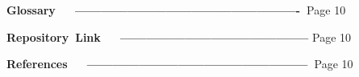\documentclass[12pt]{article}
\begin{document}
\vspace{\baselineskip}
\textbf{ Glossary\  \ \ ----------------------------------------------------\   }Page 10\par


\vspace{\baselineskip}
\textbf{ Repository\ Link\ \ \ --------------------------------------------   }Page 10\par


\vspace{\baselineskip}
\textbf{ References\ \ \ ---------------------------------------------------\   }Page 10\par


\vspace{\baselineskip}

\vspace{\baselineskip}

\vspace{\baselineskip}
 \par


\vspace{\baselineskip}
\setlength{\parskip}{8.04pt}

\vspace{\baselineskip}

\vspace{\baselineskip}

\vspace{\baselineskip}

\vspace{\baselineskip}

\vspace{\baselineskip}

\vspace{\baselineskip}

\vspace{\baselineskip}

\vspace{\baselineskip}

\vspace{\baselineskip}

\vspace{\baselineskip}

\vspace{\baselineskip}

\vspace{\baselineskip}

\vspace{\baselineskip}

\vspace{\baselineskip}
\end{document}
